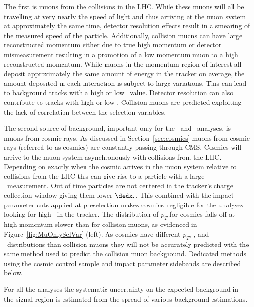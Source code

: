 The first is muons from the collisions in the LHC. While these muons will all be travelling at very nearly
the speed of light and thus arriving at the muon system at approximately the same time, detector resolution effects result in a smearing of the
measured speed of the particle. Additionally, collision muons can have large reconstructed momentum either due to true high momentum or detector mismeasurement resulting in 
a promotion of a low momentum muon to a high reconstructed momentum. While muons in the momentum region of interest all deposit approximately
the same amount of energy in the tracker on average, the amount deposited in each interaction is subject to large variations. This can lead to background tracks
with a high or low \dedx\ value. Detector resolution can also contribute to tracks with high or low \dedx. Collision muons are predicted exploiting the lack of
correlation between the selection variables.

The second source of background, important only for the \muononly\ and \fract\ analyses, is muons from cosmic rays. 
As discussed in Section~\ref{sec:cosmics} muons from cosmic rays (referred to as cosmics)
are constantly passing through CMS. Cosmics will arrive to the muon system asynchronously with collisions from the LHC. Depending on exactly
when the cosmic arrives in the muon system relative to collisions from the LHC this can give rise to a particle with a large \invbeta\ measurement.
Out of time particles are not centered in the tracker's charge collection window giving them lower $\dedx.$. This combined
with the impact parameter cuts applied at preselection makes cosmics negligible for the analyses looking for high \dedx\ in the tracker.
The distribution of $p_T$ for cosmics falls off at high momentum slower than for collision muons, as evidenced in Figure~\ref{fig:MuOnlySelVar} (left).
As cosmics have different $p_T$, \invbeta, and \dedx\ distributions than collision muons they will not be accurately predicted with the same method used to predict
the collision muon background. Dedicated methods using the cosmic control sample and impact parameter sidebands are described below.

For all the analyses the systematic uncertainty on the expected background in the signal
region is estimated from the spread of various background estimations.

